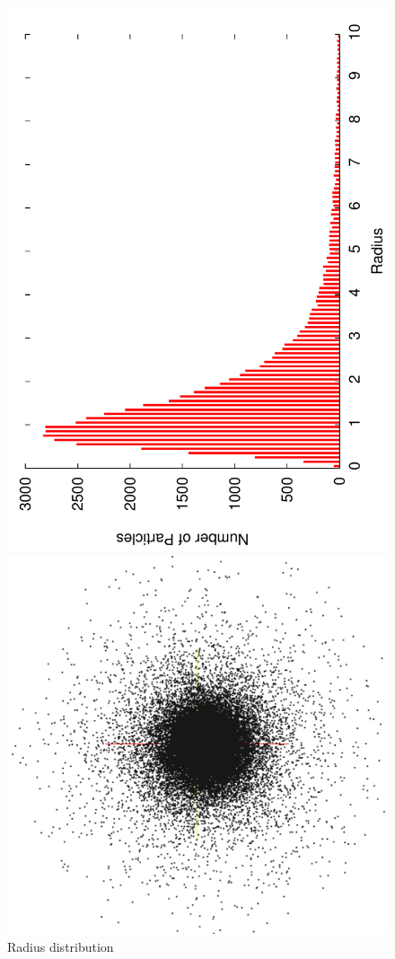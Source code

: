 \documentclass[10pt]{article}
\begin{document}
\begin{figure}[h]
  \centering
  \begin{minipage}{0.45\textwidth}%
    \includegraphics[scale=0.37,angle=-90]{plummerHistogramme}
    \caption{Radius distribution}%
  \end{minipage}%
   \qquad
  \begin{minipage}{0.45\textwidth}%
   \includegraphics[width=1.0\textwidth]{plummer3D}

\end{minipage}
\end{figure}
\end{document}
